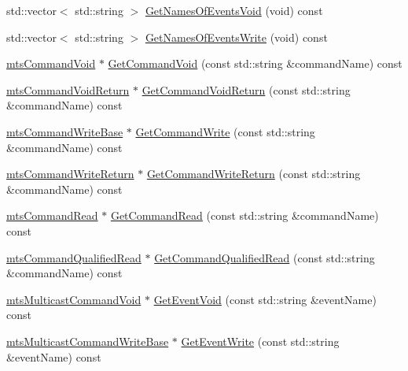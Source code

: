 {\bf }\par
\begin{DoxyCompactItemize}
\item 
std\-::vector$<$ std\-::string $>$ \hyperlink{classmts_interface_provided_ac1dee05fd82f4607bc1b2a0a8b712500}{Get\-Names\-Of\-Events\-Void} (void) const 
\item 
std\-::vector$<$ std\-::string $>$ \hyperlink{classmts_interface_provided_a46c1d7068e4f6351671d21774b1dd464}{Get\-Names\-Of\-Events\-Write} (void) const 
\end{DoxyCompactItemize}

{\bf }\par
\begin{DoxyCompactItemize}
\item 
\hyperlink{classmts_command_void}{mts\-Command\-Void} $\ast$ \hyperlink{classmts_interface_provided_ae34b95c5edc923c42b580958dfd252a9}{Get\-Command\-Void} (const std\-::string \&command\-Name) const 
\item 
\hyperlink{classmts_command_void_return}{mts\-Command\-Void\-Return} $\ast$ \hyperlink{classmts_interface_provided_a75946cdb4fd225075e1021fe5686de0f}{Get\-Command\-Void\-Return} (const std\-::string \&command\-Name) const 
\item 
\hyperlink{classmts_command_write_base}{mts\-Command\-Write\-Base} $\ast$ \hyperlink{classmts_interface_provided_a9162ce641167aa9ff88880ea44e0ebac}{Get\-Command\-Write} (const std\-::string \&command\-Name) const 
\item 
\hyperlink{classmts_command_write_return}{mts\-Command\-Write\-Return} $\ast$ \hyperlink{classmts_interface_provided_a5fcda2ac9cfefe653f765cc2d2aea374}{Get\-Command\-Write\-Return} (const std\-::string \&command\-Name) const 
\item 
\hyperlink{classmts_command_read}{mts\-Command\-Read} $\ast$ \hyperlink{classmts_interface_provided_a6f5af0ccb35820f663e65a556ef80472}{Get\-Command\-Read} (const std\-::string \&command\-Name) const 
\item 
\hyperlink{classmts_command_qualified_read}{mts\-Command\-Qualified\-Read} $\ast$ \hyperlink{classmts_interface_provided_a1e9e9d914bc355ceee89518e67b98de0}{Get\-Command\-Qualified\-Read} (const std\-::string \&command\-Name) const 
\end{DoxyCompactItemize}

{\bf }\par
\begin{DoxyCompactItemize}
\item 
\hyperlink{classmts_multicast_command_void}{mts\-Multicast\-Command\-Void} $\ast$ \hyperlink{classmts_interface_provided_a30544381f100800dd28de08ee35bba2f}{Get\-Event\-Void} (const std\-::string \&event\-Name) const 
\item 
\hyperlink{classmts_multicast_command_write_base}{mts\-Multicast\-Command\-Write\-Base} $\ast$ \hyperlink{classmts_interface_provided_aade47a65208a9ad651d0595b173eeec1}{Get\-Event\-Write} (const std\-::string \&event\-Name) const 
\end{DoxyCompactItemize}

